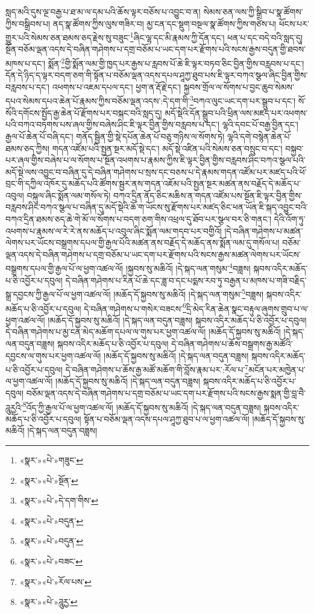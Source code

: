 སླད་མའི་དུས་ལྔ་བརྒྱ་པ་ཐ་མ་ལ་དམ་པའི་ཆོས་ལྟར་བཅོས་པ་འབྱུང་བ་ན། སེམས་ཅན་ལས་ཀྱི་སྒྲིབ་པ་སྣ་ཚོགས་ཀྱིས་བསྒྲིབས་པ། ནད་སྣ་ཚོགས་ཀྱིས་ལུས་གཟིར་བ། མྱ་ངན་དང་སྡུག་བསྔལ་སྣ་ཚོགས་ཀྱིས་གཙེས་པ། ཕོངས་པར་གྱུར་པའི་སེམས་ཅན་ཐམས་ཅད་རྗེས་སུ་བཟུང་\footnote{«སྣར་»«པེ་»གཟུང་}ཞིང་ལྷ་དང་མི་རྣམས་ཀྱི་དོན་དང་། ཕན་པ་དང་བདེ་བའི་སླད་དུ། སྔོན་བཅོམ་ལྡན་འདས་དེ་བཞིན་གཤེགས་པ་དགྲ་བཅོམ་པ་ཡང་དག་པར་རྫོགས་པའི་སངས་རྒྱས་བདུན་གྱི་ཐབས་མཁས་པ་དང་། སྨོན་\footnote{«སྣར་»«པེ་»སྔོན་}གྱི་སྨོན་ལམ་གྱི་ཁྱད་པར་རྒྱས་པ་རླབས་པོ་ཆེ་ཇི་ལྟར་བཏབ་ཅིང་བྱིན་གྱིས་བརླབས་པ་དང་། དོན་དེ་ཉིད་ད་ལྟར་བདག་ཅག་གི་སྟོན་པ་བཅོམ་ལྡན་འདས་དཔལ་ཤཱཀྱ་ཐུབ་པས་ཇི་ལྟར་བཀའ་སྩལ་ཞིང་བྱིན་གྱིས་བརླབས་པ་དང་། འཕགས་པ་འཇམ་དཔལ་དང་། ཕྱག་ན་རྡོ་རྗེ་དང་། སྐྱབས་གྲོལ་ལ་སོགས་པ་བྱང་ཆུབ་སེམས་དཔའ་སེམས་དཔའ་ཆེན་པོ་རྣམས་ཀྱིས་བཅོམ་ལྡན་འདས་:དེ་དག་གི་\footnote{«སྣར་»«པེ་»དེ་དག་གིས་}བཀའ་ལུང་ཡང་དག་པར་སྒྲུབ་པ་དང་། སོ་སོའི་དགོངས་སྤྱོད་རྒྱ་ཆེན་པོ་རྫོགས་པར་བསྐང་བའི་སླད་དུ། མདོ་སྡེའི་དོན་སྒྲུབ་པའི་ཕྲིན་ལས་མཛད་པར་འཕགས་པའི་བཀའ་བཏགས་པས་ཞལ་གྱིས་བཞེས་ཤིང་ཇི་ལྟར་བྱིན་གྱིས་བརླབས་པ་དང་། ལྷའི་དབང་པོ་བརྒྱ་བྱིན་དང་། རྒྱལ་པོ་ཆེན་པོ་བཞི་དང་། གནོད་སྦྱིན་གྱི་སྡེ་དཔོན་ཆེན་པོ་བཅུ་གཉིས་ལ་སོགས་ཏེ། ལྷའི་དགེ་བསྙེན་ཆེན་པོ་ཐམས་ཅད་ཀྱིས། གདན་འཛོམ་པའི་སྤྱན་སྔར་མདོ་སྡེ་དང་། མདོ་སྡེ་འཛིན་པའི་སེམས་ཅན་བསྲུང་བ་དང་། བསྐྱབ་པར་ཞལ་གྱིས་བཞེས་པ་ལ་སོགས་པ་སྔོན་འཕགས་པ་རྣམས་ཀྱིས་ཇི་ལྟར་བྱིན་གྱིས་བརླབས་ཤིང་བཀའ་སྩལ་པའི་མདོ་སྡེ་ལས་འབྱུང་བ་བཞིན་དུ་དེ་བཞིན་གཤེགས་པ་སྲས་དང་བཅས་པ་དེ་རྣམས་གདན་འཛོམ་པར་མཛད་པའི་ཕོ་བྲང་གི་དཀྱིལ་འཁོར་དུ་མཆོད་པའི་ཚོགས་སྦྱར་ནས་གདན་འཇོམ་པའི་སྤྱན་སྔར་མཚན་ནས་བརྗོད་དེ་མཆོད་པ་འབུལ། བསྐུལ་ཞིང་སྨོན་ལམ་གསོལ་ཏེ། བཀའ་དྲིན་ནོད་ཅིང་མཆིས་ན་གདན་འཛོམ་པས་སྔོན་ཇི་ལྟར་བྱིན་གྱིས་བརླབས་ཤིང་བཀའ་སྩལ་པ་བཞིན་དུ་མདོ་སྡེའི་ཆོ་ག་ཡོངས་སུ་རྫོགས་པར་མཛད་ཅིང་ཕན་ཡོན་ཇི་སྐད་འབྱུང་བའི་བཀའ་དྲིན་ཐམས་ཅད་ཆེ་གེ་མོ་ལ་སོགས་པ་བདག་ཅག་གིས་འཕྲལ་དུ་ཐོབ་པར་སྩལ་བར་ཅི་གནང་། དེའི་འོག་ཏུ་འཕགས་པ་རྣམས་ལ་རེ་རེ་ནས་མཆོད་པ་འབུལ་ཞིང་སྨོན་ལམ་གདབ་པར་བགྱིའོ། །དེ་བཞིན་གཤེགས་པ་མཚན་ལེགས་པར་ཡོངས་བསྒྲགས་དཔལ་གྱི་རྒྱལ་པོའི་མཚན་ནས་བརྗོད་དེ་མཆོད་ནས་སྨོན་ལམ་དུ་གསོལ་པ། བཅོམ་ལྡན་འདས་དེ་བཞིན་གཤེགས་པ་དགྲ་བཅོམ་པ་ཡང་དག་པར་རྫོགས་པའི་སངས་རྒྱས་མཚན་ལེགས་པར་ཡོངས་བསྒྲགས་དཔལ་གྱི་རྒྱལ་པོ་ལ་ཕྱག་འཚལ་ལོ། །སྐྱབས་སུ་མཆིའོ། །དེ་སྐད་ལན་གསུམ་\footnote{«སྣར་»«པེ་»བདུན་}བཟླས། སྐབས་འདིར་མཆོད་པ་ཅི་འབྱོར་པ་དབུལ། དེ་བཞིན་གཤེགས་པ་རིན་པོ་ཆེ་དང་ཟླ་བ་དང་པདྨས་རབ་ཏུ་བརྒྱན་པ་མཁས་པ་གཟི་བརྗིད་སྒྲ་དབྱངས་ཀྱི་རྒྱལ་པོ་ལ་ཕྱག་འཚལ་ལོ། །མཆོད་དོ་སྐྱབས་སུ་མཆིའོ། །དེ་སྐད་ལན་གསུམ་\footnote{«སྣར་»«པེ་»བདུན་}བཟླས། སྐབས་འདིར་མཆོད་པ་ཅི་འབྱོར་པ་དབུལ། དེ་བཞིན་གཤེགས་པ་གསེར་བཟངས་\footnote{«སྣར་»«པེ་»བཟང་}དྲི་མེད་རིན་ཆེན་སྣང་བརྟུལ་ཞུགས་གྲུབ་པ་ལ་ཕྱག་འཚལ་ལོ། །མཆོད་དོ་སྐྱབས་སུ་མཆིའོ། །དེ་སྐད་ལན་བདུན་བཟླས། སྐབས་འདིར་མཆོད་པ་ཅི་འབྱོར་པ་དབུལ། དེ་བཞིན་གཤེགས་པ་མྱ་ངན་མེད་མཆོག་དཔལ་ལ་གུས་པར་ཕྱག་འཚལ་ལོ། །མཆོད་དོ་སྐྱབས་སུ་མཆིའོ། །དེ་སྐད་ལན་བདུན་བཟླས། སྐབས་འདིར་མཆོད་པ་ཅི་འབྱོར་པ་དབུལ། དེ་བཞིན་གཤེགས་པ་ཆོས་བསྒྲགས་རྒྱ་མཚོའི་དབྱངས་ལ་གུས་པར་ཕྱག་འཚལ་ལོ། །མཆོད་དོ་སྐྱབས་སུ་མཆིའོ། །དེ་སྐད་ལན་བདུན་བཟླས། སྐབས་འདིར་མཆོད་པ་ཅི་འབྱོར་པ་དབུལ། དེ་བཞིན་གཤེགས་པ་ཆོས་རྒྱ་མཚོ་མཆོག་གི་བློས་རྣམ་པར་:རོལ་པ་\footnote{«སྣར་»«པེ་»རོལ་པས་}མངོན་པར་མཁྱེན་པ་ལ་ཕྱག་འཚལ་ལོ། །མཆོད་དོ་སྐྱབས་སུ་མཆིའོ། །དེ་སྐད་ལན་བདུན་བཟླས། སྐབས་འདིར་མཆོད་པ་ཅི་འབྱོར་པ་དབུལ། བཅོམ་ལྡན་འདས་དེ་བཞིན་གཤེགས་པ་དགྲ་བཅོམ་པ་ཡང་དག་པར་རྫོགས་པའི་སངས་རྒྱས་སྨན་གྱི་བླ་བཻ་ཌཱུརྱའི་\footnote{«སྣར་»«པེ་»ཌཱུརྱ་}འོད་ཀྱི་རྒྱལ་པོ་ལ་ཕྱག་འཚལ་ལོ། །མཆོད་དོ་སྐྱབས་སུ་མཆིའོ། །དེ་སྐད་ལན་བདུན་བཟླས། སྐབས་འདིར་མཆོད་པ་ཅི་འབྱོར་པ་དབུལ། སྟོན་པ་བཅོམ་ལྡན་འདས་དཔལ་ཤཱཀྱ་ཐུབ་པ་ལ་ཕྱག་འཚལ་ལོ། །མཆོད་དོ་སྐྱབས་སུ་མཆིའོ། །དེ་སྐད་ལན་བདུན་བཟླས། 